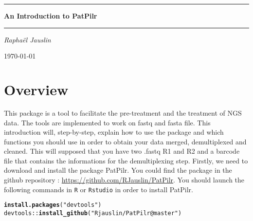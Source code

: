 \documentclass{article}\usepackage[]{graphicx}\usepackage[]{color}
\makeatletter
\newcommand{\hlstr}[1]{\textcolor[rgb]{0.192,0.494,0.8}{#1}}%
\newcommand{\hlopt}[1]{\textcolor[rgb]{0,0,0}{#1}}%
\newcommand{\hlstd}[1]{\textcolor[rgb]{0.345,0.345,0.345}{#1}}%
\newcommand{\hlkwd}[1]{\textcolor[rgb]{0.737,0.353,0.396}{\textbf{#1}}}%
\newenvironment{kframe}{%
 \def\at@end@of@kframe{}%
 \ifinner\ifhmode%
  \def\at@end@of@kframe{\end{minipage}}%
  \begin{minipage}{\columnwidth}%
 \fi\fi%
 \def\FrameCommand##1{\hskip\@totalleftmargin \hskip-\fboxsep
 \colorbox{shadecolor}{##1}\hskip-\fboxsep
     \hskip-\linewidth \hskip-\@totalleftmargin \hskip\columnwidth}%
 \MakeFramed {\advance\hsize-\width
   \@totalleftmargin\z@ \linewidth\hsize
   \@setminipage}}%
 {\par\unskip\endMakeFramed%
 \at@end@of@kframe}
\newenvironment{knitrout}{}{} %
\makeatother
\begin{document}

 \begin{titlepage}
 \hrule
 \vspace{0.5cm}
 {\huge\centering \bfseries An Introduction to PatPilr  \par}
 \vspace{0.5cm}
 \hrule
 \vspace{1.5cm}
 {\huge\bfseries \par}
 \vspace{2cm}
 {\Large\itshape Rapha\"el Jauslin\par}
 \vfill
 \vfill
 {\large \today\par}
 \end{titlepage}


\newpage

\tableofcontents
\newpage

\section{Overview}

This package is a tool to facilitate the pre-treatment and the treatment of NGS data. The tools are implemented to work on fastq and fasta file. This introduction will, step-by-step, explain how to use the package and which functions you should use in order to obtain your data merged, demultiplexed and cleaned. This will supposed that you have two .fastq R1 and R2 and a barcode file that contains the informations for the demultiplexing step. Firstly, we need to download and install the package PatPilr. You could find the package in the github repository : \url{https://github.com/RJauslin/PatPilr}. You should launch the following commands in \texttt{R} or \texttt{Rstudio} in order to install PatPilr.

\begin{knitrout}
\color{fgcolor}\begin{kframe}
\begin{alltt}
\hlkwd{install.packages}\hlstd{(}\hlstr{"devtools"}\hlstd{)}
\hlstd{devtools}\hlopt{::}\hlkwd{install_github}\hlstd{(}\hlstr{"Rjauslin/PatPilr@master"}\hlstd{)}
\end{alltt}
\end{kframe}
\end{knitrout}
\end{document}
